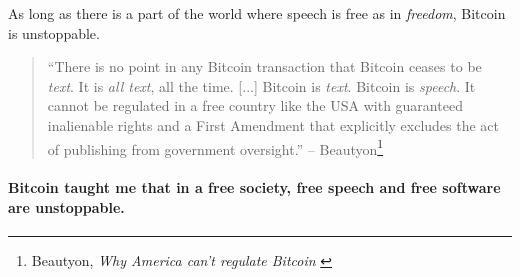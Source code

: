 As long as there is a part of the world where speech is free as in
\textit{freedom}, Bitcoin is unstoppable.

\begin{quotation}
``There is no point in any Bitcoin transaction that Bitcoin ceases to be
\textit{text}. It is \textit{all text}, all the time. [...] Bitcoin is
\textit{text}. Bitcoin is \textit{speech}. It cannot be regulated in a free
country like the USA with guaranteed inalienable rights and a First Amendment
that explicitly excludes the act of publishing from government oversight.''
\flushright -- Beautyon\footnote{Beautyon, \textit{Why America can't regulate
Bitcoin} \cite{america-regulate-bitcoin}}
\end{quotation}

\paragraph{Bitcoin taught me that in a free society, free speech and free software
are unstoppable.}

%
%
%
%
%
%
%

